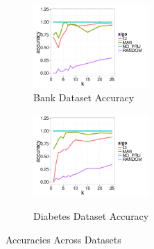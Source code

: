\begin{figure}[h]
	\centering
	\vspace*{-10pt}
	\begin{subfigure}{0.48\linewidth}
		\centering
		\includegraphics[width=4.4cm] {Images/in_memory_bank_accuracy.pdf}
		\vspace{-15pt}
		\caption{Bank Dataset Accuracy}
		\label{fig:bank_accuracy}
	\end{subfigure}
	\begin{subfigure}{0.48\linewidth}
		\centering
		\includegraphics[width=4.4cm] {Images/in_memory_dia_accuracy.pdf}\
		\vspace{-15pt}
		\caption{Diabetes Dataset Accuracy}
		\label{fig:dia_accuracy}
	\end{subfigure}
	\vspace{-10pt}
	\caption{Accuracies Across Datasets}
	\vspace{-10pt}
\end{figure}






